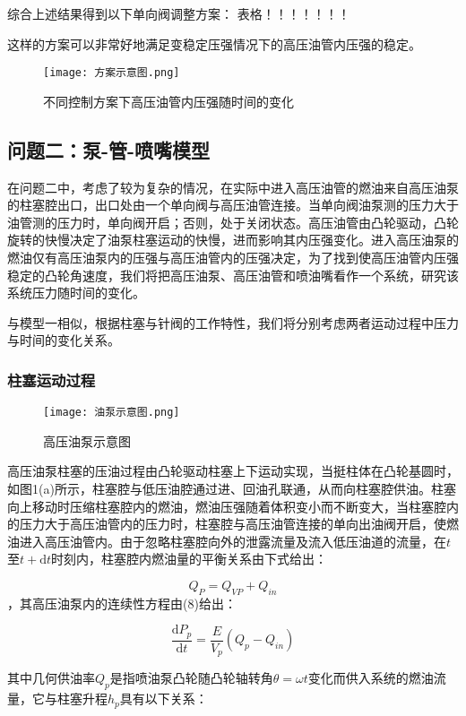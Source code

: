 \documentclass[withoutpreface,bwprint]{cumcmthesis} %
\begin{document}
			综合上述结果得到以下单向阀调整方案：
			表格！！！！！！！
			
			这样的方案可以非常好地满足变稳定压强情况下的高压油管内压强的稳定。
			\begin{figure}[!htbp]
				\centering
				\texttt{[image: 方案示意图.png]}
				\caption{不同控制方案下高压油管内压强随时间的变化}
			\end{figure}
			\subsection{问题二：泵-管-喷嘴模型}
			在问题二中，考虑了较为复杂的情况，在实际中进入高压油管的燃油来自高压油泵的柱塞腔出口，出口处由一个单向阀与高压油管连接。当单向阀油泵测的压力大于油管测的压力时，单向阀开启；否则，处于关闭状态。高压油管由凸轮驱动，凸轮旋转的快慢决定了油泵柱塞运动的快慢，进而影响其内压强变化。进入高压油泵的燃油仅有高压油泵内的压强与高压油管内的压强决定，为了找到使高压油管内压强稳定的凸轮角速度，我们将把高压油泵、高压油管和喷油嘴看作一个系统，研究该系统压力随时间的变化。
			
			与模型一相似，根据柱塞与针阀的工作特性，我们将分别考虑两者运动过程中压力与时间的变化关系。
			\subsubsection{柱塞运动过程}
			\begin{figure}[!htbp]
				\centering
				\texttt{[image: 油泵示意图.png]}
				\caption{高压油泵示意图}
			\end{figure}
			
			高压油泵柱塞的压油过程由凸轮驱动柱塞上下运动实现，当挺柱体在凸轮基圆时，如图1(a)所示，柱塞腔与低压油腔通过进、回油孔联通，从而向柱塞腔供油。柱塞向上移动时压缩柱塞腔内的燃油，燃油压强随着体积变小而不断变大，当柱塞腔内的压力大于高压油管内的压力时，柱塞腔与高压油管连接的单向出油阀开启，使燃油进入高压油管内。由于忽略柱塞腔向外的泄露流量及流入低压油道的流量，在$t$至$t + \mathrm{d}t$时刻内，柱塞腔内燃油量的平衡关系由下式给出：
			
			\begin{equation}Q_P = Q_{VP} + Q_{in}\end{equation}，其高压油泵内的连续性方程由(8)给出：
			
			\begin{equation}\frac{\mathrm{d}P_p}{\mathrm{d}t} = \frac{E}{V_p}(Q_{p} - Q_{in})\end{equation}
			
			其中几何供油率$Q_p$是指喷油泵凸轮随凸轮轴转角$\theta = \omega t$变化而供入系统的燃油流量，它与柱塞升程$h_p$具有以下关系：
			
\end{document}
